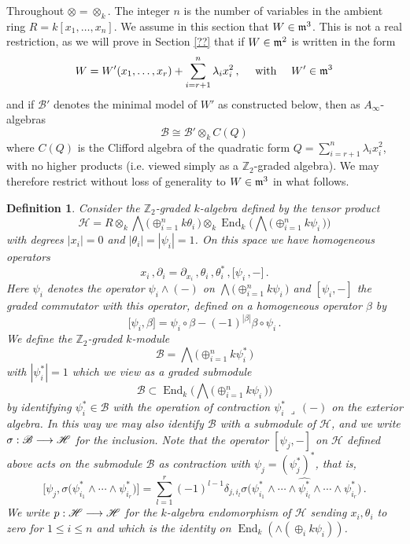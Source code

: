\documentclass[english,letter paper,12pt,leqno]{article}
\theoremstyle{example}
\newtheorem{definition}[theorem]{Definition}
\numberwithin{equation}{section}
\def\be{\begin{equation}}
\def\ee{\end{equation}}
\def\nZ{\mathds{Z}}
\DeclareMathOperator{\End}{End}
\begin{document}
Throughout $\otimes = \otimes_k$. The integer $n$ is the number of variables in the ambient ring $R = k[x_1,\ldots,x_n]$. We assume in this section that $W \in \mathfrak{m}^3$. This is not a real restriction, as we will prove in Section \ref{??} that if $W \in \mathfrak{m}^2$ is written in the form
\be
W = W'(x_1,\ldots,x_r) + \sum_{i={r+1}}^n \lambda_i x_i^2\,, \quad \text{ with } \quad W' \in \mf{m}^3
\ee
and if $\mathscr{B}'$ denotes the minimal model of $W'$ as constructed below, then as $A_\infty$-algebras
\be
\mathscr{B} \cong \mathscr{B}' \otimes_k C( Q )
\ee
where $C(Q)$ is the Clifford algebra of the quadratic form $Q = \sum_{i=r+1}^n \lambda_i x_i^2$, with no higher products (i.e. viewed simply as a $\nZ_2$-graded algebra). We may therefore restrict without loss of generality to $W \in \mathfrak{m}^3$ in what follows.

\begin{definition}\label{defn:handop} Consider the $\nZ_2$-graded $k$-algebra defined by the tensor product
\be
\mathscr{H} = R \otimes_k \bigwedge\big( \oplus_{i=1}^n k \theta_i \,\big) \otimes_k \End_k\Big( \bigwedge\big( \oplus_{i=1}^n k \psi_i \, \big) \Big)
\ee
with degrees $|x_i| = 0$ and $|\theta_i| = |\psi_i| = 1$. On this space we have homogeneous operators
\be
x_i\,, \partial_i = \partial_{x_i}\,, \theta_i\,, \theta_i^*\,, \big[\psi_i\,,-\big]\,.
\ee
Here $\psi_i$ denotes the operator $\psi_i \wedge (-)$ on $\bigwedge\big( \oplus_{i=1}^n k \psi_i \, \big)$ and $[ \psi_i, - ]$ the graded commutator with this operator, defined on a homogeneous operator $\beta$ by
\[
\big[ \psi_i, \beta \big] = \psi_i \circ \beta - (-1)^{|\beta|} \beta \circ \psi_i\,.
\]
We define the $\nZ_2$-graded $k$-module
\be\label{defn:B}
\mathscr{B} = \bigwedge\big( \oplus_{i=1}^n k \psi_i^* \,\big)
\ee
with $|\psi_i^*| = 1$ which we view as a graded submodule
\[
\mathscr{B} \subset \End_k\Big( \bigwedge\big( \oplus_{i=1}^n k \psi_i \, \big) \Big)
\]
by identifying $\psi_i^* \in \mathscr{B}$ with the operation of contraction $\psi_i^*\, \lrcorner\, (-)$ on the exterior algebra. In this way we may also identify $\mathscr{B}$ with a submodule of $\mathscr{H}$, and we write $\sigma: \mathscr{B} \longrightarrow \mathscr{H}$ for the inclusion. Note that the operator $[\psi_j, -]$ on $\mathscr{H}$ defined above acts on the submodule $\mathscr{B}$ as contraction with $\psi_j = (\psi_j^*)^*$, that is,
\be\label{eq:comm_is_ann}
\Big[ \psi_j, \sigma\big(\psi_{i_1}^* \wedge \cdots \wedge \psi_{i_r}^*\big) \Big] = \sum_{l=1}^r (-1)^{l-1} \delta_{j, i_l} \sigma\big(\psi_{i_1}^* \wedge \cdots \wedge \widehat{ \psi_{i_l}^* } \wedge \cdots \wedge \psi_{i_r}^*\big)\,.
\ee
We write $p: \mathscr{H} \longrightarrow \mathscr{H}$ for the $k$-algebra endomorphism of $\mathscr{H}$ sending $x_i, \theta_i$ to zero for $1 \le i \le n$ and which is the identity on $\End_k( \wedge( \oplus_i k\psi_i ) )$.
\end{definition}
\end{document}
